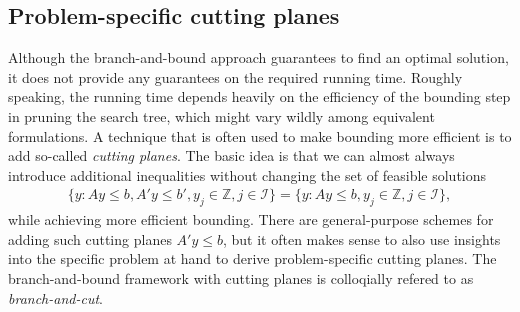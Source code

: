 \documentclass[a4paper]{report}
\theoremstyle{definition}
\theoremstyle{plain}
\begin{document}
\subsection{Problem-specific cutting planes}
Although the branch-and-bound approach guarantees to find an optimal solution, it
does not provide any guarantees on the required running time.
%
Roughly speaking, the running time depends heavily on the efficiency of the
bounding step in pruning the search tree, which might vary wildly among
equivalent formulations.
%
A technique that is often used to make bounding more efficient is to add
so-called \emph{cutting planes}.
%
The basic idea is that we can almost always introduce additional inequalities
without changing the set of feasible solutions
\begin{align}
  \{ y : Ay \leq b, A'y \leq b', y_j \in \mathbb{Z}, j \in \mathcal{I} \} = \{ y : Ay \leq b, y_j \in \mathbb{Z}, j \in \mathcal{I} \} ,
\end{align}
while achieving more efficient bounding.
%
There are general-purpose schemes for adding such cutting planes $A' y \leq b$,
but it often makes sense to also use insights into the specific problem at hand
to derive problem-specific cutting planes.
%
The branch-and-bound framework with cutting planes is colloqially refered to as
\emph{branch-and-cut}.
\end{document}
